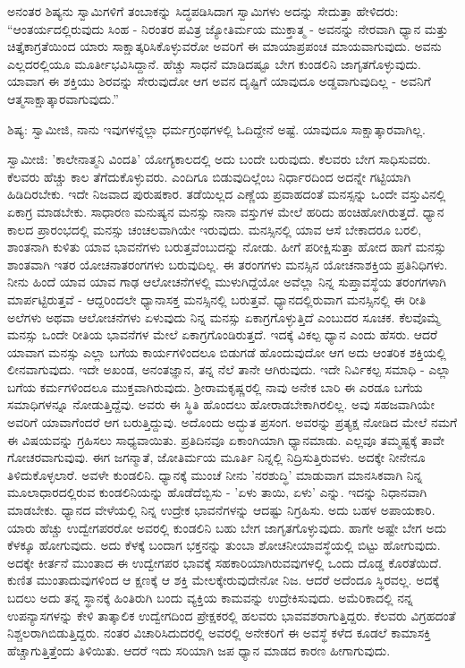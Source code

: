 ಅನಂತರ ಶಿಷ್ಯನು ಸ್ವಾಮಿಗಳಿಗೆ ತಂಬಾಕನ್ನು ಸಿದ್ಧಪಡಿಸಿದಾಗ ಸ್ವಾಮಿಗಳು ಅದನ್ನು ಸೇದುತ್ತಾ ಹೇಳಿದರು: “ಆಂತರ್ಯದಲ್ಲಿರುವುದು ಸಿಂಹ - ನಿರಂತರ ಪವಿತ್ರ ಜ್ಯೋತಿರ್ಮಯ ಮುಕ್ತಾತ್ಮ - ಅವನನ್ನು ನೇರವಾಗಿ ಧ್ಯಾನ ಮತ್ತು ಚಿತ್ತೈಕಾಗ್ರತೆಯಿಂದ ಯಾರು ಸಾಕ್ಷಾತ್ಕರಿಸಿಕೊಳ್ಳುವರೋ ಅವರಿಗೆ ಈ ಮಾಯಾಪ್ರಪಂಚ ಮಾಯವಾಗುವುದು. ಅವನು ಎಲ್ಲದರಲ್ಲಿಯೂ ಮೂರ್ತೀಭವಿಸಿದ್ದಾನೆ. ಹೆಚ್ಚು ಸಾಧನೆ ಮಾಡಿದಷ್ಟೂ ಬೇಗ ಕುಂಡಲಿನಿ ಜಾಗೃತಗೊಳ್ಳುವುದು. ಯಾವಾಗ ಈ ಶಕ್ತಿಯು ಶಿರವನ್ನು ಸೇರುವುದೋ ಆಗ ಅವನ ದೃಷ್ಟಿಗೆ ಯಾವುದೂ ಅಡ್ಡವಾಗುವುದಿಲ್ಲ - ಅವನಿಗೆ ಆತ್ಮಸಾಕ್ಷಾತ್ಕಾರವಾಗುವುದು.”

ಶಿಷ್ಯ: ಸ್ವಾಮೀಜಿ, ನಾನು ಇವುಗಳನ್ನೆಲ್ಲಾ ಧರ್ಮಗ್ರಂಥಗಳಲ್ಲಿ ಓದಿದ್ದೇನೆ ಅಷ್ಟೆ. ಯಾವುದೂ ಸಾಕ್ಷಾತ್ಕಾರವಾಗಿಲ್ಲ.

ಸ್ವಾಮೀಜಿ: 'ಕಾಲೇನಾತ್ಮನಿ ವಿಂದತಿ' ಯೋಗ್ಯಕಾಲದಲ್ಲಿ ಅದು ಬಂದೇ ಬರುವುದು. ಕೆಲವರು ಬೇಗ ಸಾಧಿಸುವರು. ಕೆಲವರು ಹೆಚ್ಚು ಕಾಲ ತೆಗೆದುಕೊಳ್ಳುವರು. ಎಂದಿಗೂ ಬಿಡುವುದಿಲ್ಲೆಂಬ ನಿರ್ಧಾರದಿಂದ ಅದನ್ನೇ ಗಟ್ಟಿಯಾಗಿ ಹಿಡಿದಿರಬೇಕು. ಇದೇ ನಿಜವಾದ ಪುರುಷಕಾರ. ತಡೆಯಿಲ್ಲದ ಎಣ್ಣೆಯ ಪ್ರವಾಹದಂತೆ ಮನಸ್ಸನ್ನು ಒಂದೇ ವಸ್ತುವಿನಲ್ಲಿ ಏಕಾಗ್ರ ಮಾಡಬೇಕು. ಸಾಧಾರಣ ಮನುಷ್ಯನ ಮನಸ್ಸು ನಾನಾ ವಸ್ತುಗಳ ಮೇಲೆ ಹರಿದು ಹಂಚಿಹೋಗಿರುತ್ತದೆ. ಧ್ಯಾನ ಕಾಲದ ಪ್ರಾರಂಭದಲ್ಲಿ ಮನಸ್ಸು ಚಂಚಲವಾಗಿಯೇ ಇರುವುದು. ಮನಸ್ಸಿನಲ್ಲಿ ಯಾವ ಆಸೆ ಬೇಕಾದರೂ ಬರಲಿ, ಶಾಂತನಾಗಿ ಕುಳಿತು ಯಾವ ಭಾವನೆಗಳು ಬರುತ್ತವೆಂಬುದನ್ನು ನೋಡು. ಹೀಗೆ ಪರೀಕ್ಷಿಸುತ್ತಾ ಹೋದ ಹಾಗೆ ಮನಸ್ಸು ಶಾಂತವಾಗಿ ಇತರ ಯೋಚನಾತರಂಗಗಳು ಬರುವುದಿಲ್ಲ. ಈ ತರಂಗಗಳು ಮನಸ್ಸಿನ ಯೋಚನಾಶಕ್ತಿಯ ಪ್ರತಿನಿಧಿಗಳು. ನೀನು ಹಿಂದೆ ಯಾವ ಯಾವ ಗಾಢ ಆಲೋಚನೆಗಳಲ್ಲಿ ಮುಳುಗಿದ್ದೆಯೋ ಅವೆಲ್ಲಾ ನಿನ್ನ ಸುಪ್ತಾವಸ್ಥೆಯ ತರಂಗಗಳಾಗಿ ಮಾರ್ಪಟ್ಟಿರುತ್ತವೆ - ಆದ್ದರಿಂದಲೇ ಧ್ಯಾನಾಸಕ್ತ ಮನಸ್ಸಿನಲ್ಲಿ ಬರುತ್ತವೆ. ಧ್ಯಾನದಲ್ಲಿರುವಾಗ ಮನಸ್ಸಿನಲ್ಲಿ ಈ ರೀತಿ ಅಲೆಗಳು ಅಥವಾ ಆಲೋಚನೆಗಳು ಏಳುವುದು ನಿನ್ನ ಮನಸ್ಸು ಏಕಾಗ್ರಗೊಳ್ಳುತ್ತಿದೆ ಎಂಬುದರ ಸೂಚಕ. ಕೆಲವೊಮ್ಮೆ ಮನಸ್ಸು ಒಂದೇ ರೀತಿಯ ಭಾವನೆಗಳ ಮೇಲೆ ಏಕಾಗ್ರಗೊಂಡಿರುತ್ತದೆ. ಇದಕ್ಕೆ ವಿಕಲ್ಪ ಧ್ಯಾನ ಎಂದು ಹೆಸರು. ಆದರೆ ಯಾವಾಗ ಮನಸ್ಸು ಎಲ್ಲಾ ಬಗೆಯ ಕಾರ್ಯಗಳಿಂದಲೂ ಬಿಡುಗಡೆ ಹೊಂದುವುದೋ ಆಗ ಅದು ಆಂತರಿಕ ಶಕ್ತಿಯಲ್ಲಿ ಲೀನವಾಗುವುದು. ಇದೇ ಅಖಂಡ, ಅನಂತಜ್ಞಾನ, ತನ್ನ ನೆಲೆ ತಾನೇ ಆಗಿರುವುದು. ಇದೇ ನಿರ್ವಿಕಲ್ಪ ಸಮಾಧಿ - ಎಲ್ಲಾ ಬಗೆಯ ಕರ್ಮಗಳಿಂದಲೂ ಮುಕ್ತವಾಗಿರುವುದು. ಶ‍್ರೀರಾಮಕೃಷ್ಣರಲ್ಲಿ ನಾವು ಅನೇಕ ಬಾರಿ ಈ ಎರಡೂ ಬಗೆಯ ಸಮಾಧಿಗಳನ್ನೂ ನೋಡುತ್ತಿದ್ದೆವು. ಅವರು ಈ ಸ್ಥಿತಿ ಹೊಂದಲು ಹೋರಾಡಬೇಕಾಗಿರಲಿಲ್ಲ. ಅವು ಸಹಜವಾಗಿಯೇ ಅವರಿಗೆ ಯಾವಾಗೆಂದರೆ ಆಗ ಬರುತ್ತಿದ್ದುವು. ಅದೊಂದು ಅದ್ಭುತ ಪ್ರಸಂಗ. ಅವರನ್ನು ಪ್ರತ್ಯಕ್ಷ ನೋಡಿದ ಮೇಲೆ ನಮಗೆ ಈ ವಿಷಯವನ್ನು ಗ್ರಹಿಸಲು ಸಾಧ್ಯವಾಯಿತು. ಪ್ರತಿದಿನವೂ ಏಕಾಂಗಿಯಾಗಿ ಧ್ಯಾನಮಾಡು. ಎಲ್ಲವೂ ತಮ್ಮಷ್ಟಕ್ಕೆ ತಾವೇ ಗೋಚರವಾಗುವುವು. ಈಗ ಜಗನ್ಮಾತೆ, ಜೋತಿರ್ಮಯ ಮೂರ್ತಿ ನಿನ್ನಲ್ಲಿ ನಿದ್ರಿಸುತ್ತಿರುವಳು. ಅದಕ್ಕೇ ನೀನೇನೂ ತಿಳಿದುಕೊಳ್ಳಲಾರೆ. ಅವಳೇ ಕುಂಡಲಿನಿ. ಧ್ಯಾನಕ್ಕೆ ಮುಂಚೆ ನೀನು 'ನರಶುದ್ಧಿ' ಮಾಡುವಾಗ ಮಾನಸಿಕವಾಗಿ ನಿನ್ನ ಮೂಲಾಧಾರದಲ್ಲಿರುವ ಕುಂಡಲಿನಿಯನ್ನು ಹೊಡೆದೆಬ್ಬಿಸು - 'ಏಳು ತಾಯಿ, ಏಳು' ಎನ್ನು. ಇದನ್ನು ನಿಧಾನವಾಗಿ ಮಾಡಬೇಕು. ಧ್ಯಾನದ ವೇಳೆಯಲ್ಲಿ ನಿನ್ನ ಉದ್ರೇಕ ಭಾವನೆಗಳನ್ನು ಆದಷ್ಟು ನಿಗ್ರಹಿಸು. ಅದು ಬಹಳ ಅಪಾಯಕಾರಿ. ಯಾರು ಹೆಚ್ಚು ಉದ್ವೇಗಪರರೋ ಅವರಲ್ಲಿ ಕುಂಡಲಿನಿ ಬಹು ಬೇಗ ಜಾಗೃತಗೊಳ್ಳುವುದು. ಹಾಗೇ ಅಷ್ಟೇ ಬೇಗ ಅದು ಕೆಳಕ್ಕೂ ಹೋಗುವುದು. ಅದು ಕೆಳಕ್ಕೆ ಬಂದಾಗ ಭಕ್ತನನ್ನು ತುಂಬಾ ಶೋಚನೀಯಾವಸ್ಥೆಯಲ್ಲಿ ಬಿಟ್ಟು ಹೋಗುವುದು. ಅದಕ್ಕೇ ಕೀರ್ತನೆ ಮುಂತಾದ ಈ ಉದ್ವೇಗಪರ ಭಾವಕ್ಕೆ ಸಹಕಾರಿಯಾಗಿರುವವುಗಳಲ್ಲಿ ಒಂದು ದೊಡ್ಡ ಕೊರತೆಯಿದೆ. ಕುಣಿತ ಮುಂತಾದುವುಗಳಿಂದ ಆ ಕ್ಷಣಕ್ಕೆ ಆ ಶಕ್ತಿ ಮೇಲಕ್ಕೇರುವುದೇನೋ ನಿಜ. ಆದರೆ ಅದೆಂದೂ ಸ್ಥಿರವಲ್ಲ. ಅದಕ್ಕೆ ಬದಲು ಅದು ತನ್ನ ಸ್ಥಾನಕ್ಕೆ ಹಿಂತಿರುಗಿ ಬಂದು ವ್ಯಕ್ತಿಯ ಕಾಮವನ್ನು ಉದ್ರೇಕಿಸುವುದು. ಅಮೆರಿಕಾದಲ್ಲಿ ನನ್ನ ಉಪನ್ಯಾಸಗಳನ್ನು ಕೇಳಿ ತಾತ್ಕಾಲಿಕ ಉದ್ವೇಗದಿಂದ ಪ್ರೇಕ್ಷಕರಲ್ಲಿ ಹಲವರು ಭಾವವಶರಾಗುತ್ತಿದ್ದರು. ಕೆಲವರು ವಿಗ್ರಹದಂತೆ ನಿಶ್ಚಲರಾಗಿಬಿಡುತ್ತಿದ್ದರು. ನಂತರ ವಿಚಾರಿಸಿದುದರಲ್ಲಿ ಅವರಲ್ಲಿ ಅನೇಕರಿಗೆ ಈ ಅವಸ್ಥೆ ಕಳೆದ ಕೂಡಲೆ ಕಾಮಾಸಕ್ತಿ ಹೆಚ್ಚಾಗುತ್ತಿತ್ತೆಂದು ತಿಳಿಯಿತು. ಆದರೆ ಇದು ಸರಿಯಾಗಿ ಜಪ ಧ್ಯಾನ ಮಾಡದ ಕಾರಣ ಹೀಗಾಗುವುದು.

